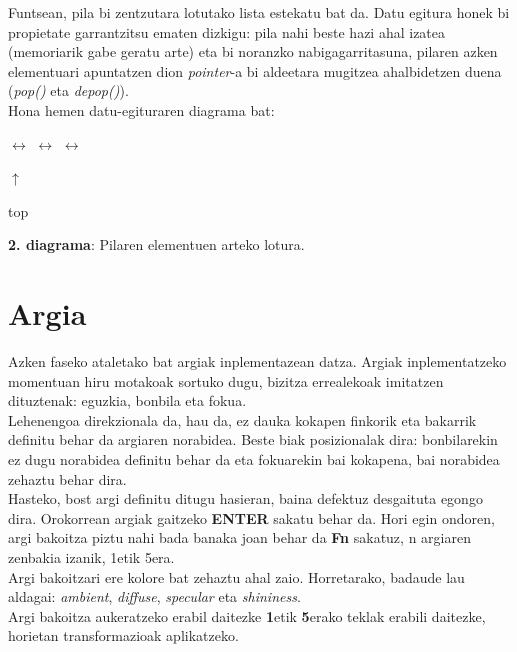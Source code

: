 \documentclass[12pt]{article}
\newcommand{\metodo}[1] {\textit{#1}}
\newcommand{\aldagai}[1] {\textit{#1}}
\newcommand{\tekla}[1] {\textbf{#1}}
\begin{document}
Funtsean, pila bi zentzutara lotutako lista estekatu bat da. Datu egitura honek bi propietate garrantzitsu ematen dizkigu: pila nahi beste hazi ahal izatea (memoriarik gabe geratu arte) eta bi noranzko nabigagarritasuna, pilaren azken elementuari apuntatzen dion \textit{pointer}-a bi aldeetara mugitzea ahalbidetzen duena (\metodo{pop()} eta \metodo{depop()}).\\
Hona hemen datu-egituraren diagrama bat:

\begin{center}

 $\leftrightarrow$  $\leftrightarrow$  $\leftrightarrow$ 

\hspace{5.5cm} $\uparrow$

\hspace{5.5cm} top

\textbf{2. diagrama}: Pilaren elementuen arteko lotura.
\end{center}

\section{Argia}

Azken faseko ataletako bat argiak inplementazean datza. Argiak inplementatzeko momentuan hiru motakoak sortuko dugu, bizitza errealekoak imitatzen dituztenak: eguzkia, bonbila eta fokua.\\

Lehenengoa direkzionala da, hau da, ez dauka kokapen finkorik eta bakarrik definitu behar da argiaren norabidea. Beste biak posizionalak dira: bonbilarekin ez dugu norabidea definitu behar da eta fokuarekin bai kokapena, bai norabidea zehaztu behar dira.\\

Hasteko, bost argi definitu ditugu hasieran, baina defektuz desgaituta egongo dira. Orokorrean argiak gaitzeko \tekla{ENTER} sakatu behar da. Hori egin ondoren, argi bakoitza piztu nahi bada banaka joan behar da \tekla{Fn} sakatuz, n argiaren zenbakia izanik, 1etik 5era.\\

Argi bakoitzari ere kolore bat zehaztu ahal zaio. Horretarako, badaude lau aldagai:  \aldagai{ambient}, \aldagai{diffuse}, \aldagai{specular} eta \aldagai{shininess}.\\

Argi bakoitza aukeratzeko erabil daitezke \tekla{1}etik \tekla{5}erako teklak erabili daitezke, horietan transformazioak aplikatzeko.
\end{document}
